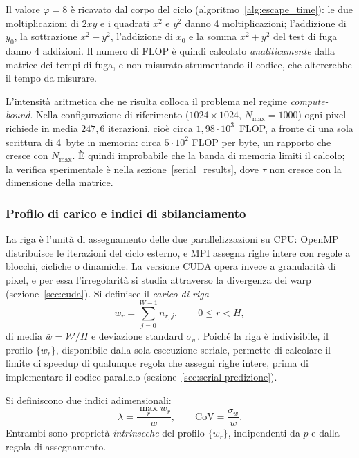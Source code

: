 Il valore $\varphi = 8$ è ricavato dal corpo del ciclo
(algoritmo~\ref{alg:escape_time}): le due moltiplicazioni di $2xy$ e i quadrati
$x^2$ e $y^2$ danno 4 moltiplicazioni; l'addizione di $y_0$, la sottrazione
$x^2 - y^2$, l'addizione di $x_0$ e la somma $x^2 + y^2$ del test di fuga danno
4 addizioni. Il numero di FLOP è quindi calcolato \emph{analiticamente} dalla
matrice dei tempi di fuga, e non misurato strumentando il codice, che
altererebbe il tempo da misurare.

L'intensità aritmetica che ne risulta colloca il problema nel regime
\emph{compute-bound}. Nella configurazione di riferimento ($1024\times1024$,
$N_{\max}=1000$) ogni pixel richiede in media $247{,}6$ iterazioni, cioè circa
$1{,}98\cdot10^{3}$~FLOP, a fronte di una sola scrittura di 4~byte in memoria:
circa $5\cdot10^{2}$ FLOP per byte, un rapporto che cresce con $N_{\max}$. È
quindi improbabile che la banda di memoria limiti il calcolo; la verifica
sperimentale è nella sezione~\ref{serial_results}, dove $\tau$ non cresce con la
dimensione della matrice.

\subsubsection{Profilo di carico e indici di sbilanciamento}
\label{sec:profilo-carico}

La riga è l'unità di assegnamento delle due parallelizzazioni su CPU: OpenMP
distribuisce le iterazioni del ciclo esterno, e MPI assegna righe intere con
regole a blocchi, cicliche o dinamiche. La versione CUDA opera invece a
granularità di pixel, e per essa l'irregolarità si studia attraverso la
divergenza dei warp (sezione~\ref{sec:cuda}). Si definisce il \emph{carico di
riga}
%
\begin{equation}
    w_r = \sum_{j=0}^{W-1} n_{r,j}, \qquad 0 \le r < H,
    \label{eq:carico-riga}
\end{equation}
%
di media $\bar{w} = \mathcal{W}/H$ e deviazione standard $\sigma_w$. Poiché la
riga è indivisibile, il profilo $\{w_r\}$, disponibile dalla sola esecuzione
seriale, permette di calcolare il limite di speedup di qualunque regola che
assegni righe intere, prima di implementare il codice parallelo
(sezione~\ref{sec:serial-predizione}).

Si definiscono due indici adimensionali:
%
\begin{equation}
    \lambda = \frac{\max_r w_r}{\bar{w}},
    \qquad
    \mathrm{CoV} = \frac{\sigma_w}{\bar{w}}.
    \label{eq:indicatori}
\end{equation}
%
Entrambi sono proprietà \emph{intrinseche} del profilo $\{w_r\}$, indipendenti
da $p$ e dalla regola di assegnamento.

